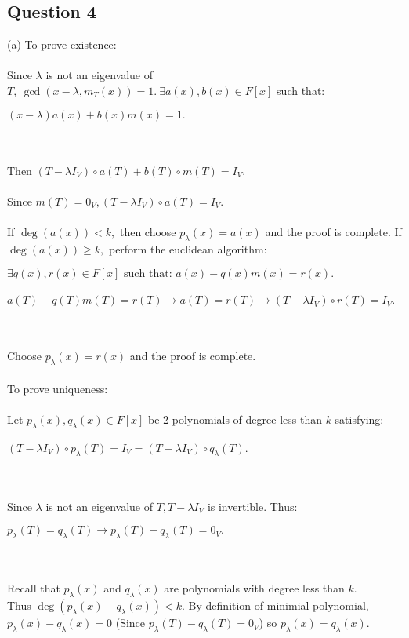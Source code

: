 \documentclass{article}
\begin{document}
\subsection*{Question 4}
(a) To prove existence: \\\\
Since $\lambda$ is not an eigenvalue of $T, \ \gcd(x-\lambda,m_T(x)) = 1. \ \exists a(x),b(x) \in F[x]$ such that:\begin{center}
$(x-\lambda)a(x) + b(x)m(x) = 1.$  
\end{center}\\\\
Then $(T-\lambda I_V)\circ a(T) + b(T)\circ m(T) = I_V$. \\\\Since $m(T) = 0_V, (T-\lambda I_V)\circ a(T) = I_V.$\\\\
If $\deg(a(x)) < k,$ then choose $p_\lambda(x)=a(x)$ and the proof is complete.
If $\deg(a(x)) \geq k,$ perform the euclidean algorithm:
\begin{center}
    $\exists q(x),r(x) \in F[x] \text{ such that: } a(x) - q(x)m(x) = r(x).$\\\\$
    a(T) - q(T)m(T) = r(T) \to a(T) = r(T) \to (T-\lambda I_V)\circ r(T) = I_V.$
\end{center}\\\\
Choose $p_\lambda(x) = r(x)$ and the proof is complete.\\\\
To prove uniqueness:\\\\
Let $p_\lambda(x),q_\lambda(x)\in F[x]$ be 2 polynomials of degree less than $k$ satisfying:\begin{center}
    $(T-\lambda I_V)\circ p_\lambda(T) = I_V = (T-\lambda I_V)\circ q_\lambda(T)$.
\end{center}\\\\
Since $\lambda$ is not an eigenvalue of $T,T-\lambda I_V$ is invertible. Thus:\begin{center}
    $p_\lambda(T) = q_\lambda(T) \to p_\lambda(T) - q_\lambda(T) = 0_V.$
\end{center}\\\\
Recall that $p_\lambda(x)$ and $q_\lambda(x)$ are polynomials with degree less than $k$. \\Thus $\deg(p_\lambda(x) - q_\lambda(x)) < k.$ By definition of minimial polynomial,\\ $p_\lambda(x)-q_\lambda(x) = 0$ (Since $p_\lambda(T)-q_\lambda(T)=0_V$) so $p_\lambda(x) = q_\lambda(x).$\\\\
\end{document}
